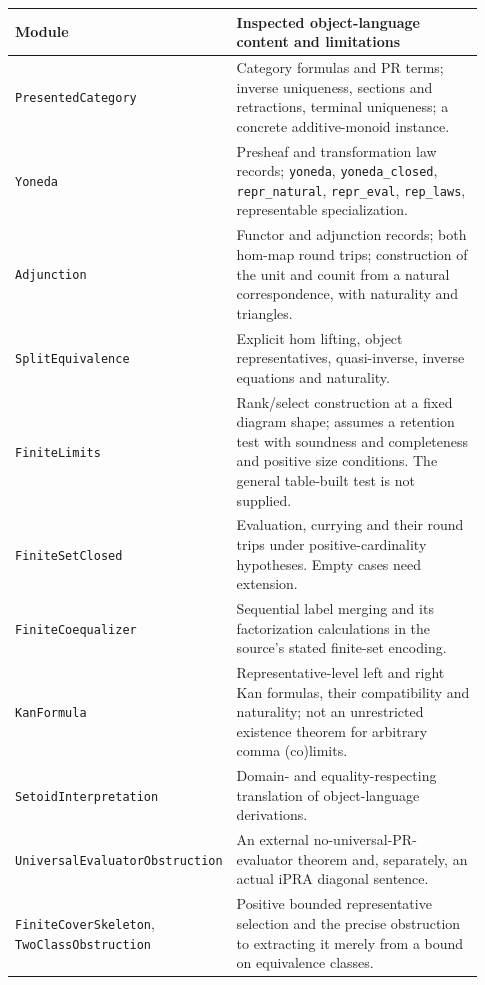 \begin{longtable}{@{}>{\raggedright\arraybackslash}p{0.30\linewidth}>{\raggedright\arraybackslash}p{0.63\linewidth}@{}}
\toprule
Module & Inspected object-language content and limitations\\
\midrule
\endhead
\texttt{PresentedCategory} & Category formulas and PR terms; inverse
uniqueness, sections and retractions, terminal uniqueness; a concrete
additive-monoid instance.\\
\texttt{Yoneda} & Presheaf and transformation law records;
\texttt{yoneda}, \texttt{yoneda\_closed}, \texttt{repr\_natural},
\texttt{repr\_eval}, \texttt{rep\_laws}, representable specialization.\\
\texttt{Adjunction} & Functor and adjunction records; both hom-map
round trips; construction of the unit and counit from a natural
correspondence, with naturality and triangles.\\
\texttt{SplitEquivalence} & Explicit hom lifting, object representatives,
quasi-inverse, inverse equations and naturality.\\
\texttt{FiniteLimits} & Rank/select construction at a fixed diagram
shape; assumes a retention test with soundness and completeness and
positive size conditions. The general table-built test is not supplied.\\
\texttt{FiniteSetClosed} & Evaluation, currying and their round trips
under positive-cardinality hypotheses. Empty cases need extension.\\
\texttt{FiniteCoequalizer} & Sequential label merging and its
factorization calculations in the source's stated finite-set encoding.\\
\texttt{KanFormula} & Representative-level left and right Kan formulas,
their compatibility and naturality; not an unrestricted existence
theorem for arbitrary comma (co)limits.\\
\texttt{SetoidInterpretation} & Domain- and equality-respecting
translation of object-language derivations.\\
\texttt{UniversalEvaluator}\linebreak\texttt{Obstruction} & An external no-universal-PR-
evaluator theorem and, separately, an actual iPRA diagonal sentence.\\
\texttt{FiniteCoverSkeleton}, \texttt{TwoClassObstruction} & Positive
bounded representative selection and the precise obstruction to
extracting it merely from a bound on equivalence classes.\\
\bottomrule
\end{longtable}

